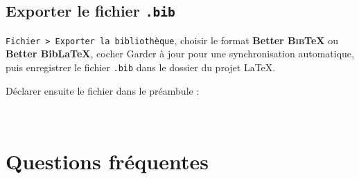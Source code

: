 \documentclass[12pt, a4paper]{article}
\newcommand{\BibTeX}{\textsc{Bib}\TeX}
\begin{document}
\subsection{Exporter le fichier \texttt{.bib}}

\texttt{Fichier > Exporter la bibliothèque}, choisir le format
\textbf{Better \BibTeX} ou \textbf{Better Bib\LaTeX}, cocher
\og Garder à jour \fg{} pour une synchronisation automatique, puis enregistrer
le fichier \texttt{.bib} dans le dossier du projet \LaTeX{}.

Déclarer ensuite le fichier dans le préambule :

\begin{lstlisting}[style=latexcode]


\end{lstlisting}

\section{Questions fréquentes}
\end{document}
